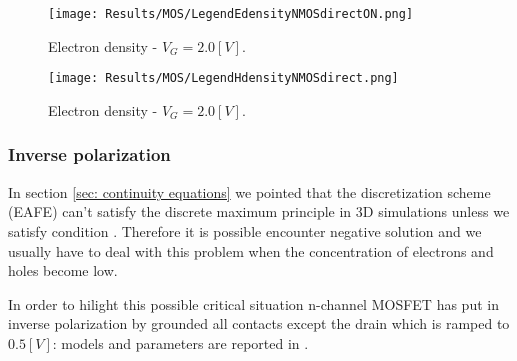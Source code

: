 \begin{figure}[!h]
\centering
{}
\hspace{0.06\textwidth}
\hspace{0.04\textwidth}
{\texttt{[image: Results/MOS/LegendEdensityNMOSdirectON.png]}}
\caption{Electron density - $V_G = 2.0 [V]$.}
\label{fig: ndensity mos}
\end{figure}

\vspace{0.5cm}

\begin{figure}[!h]
\centering
{}
\hspace{0.06\textwidth}
\hspace{0.04\textwidth}
{\texttt{[image: Results/MOS/LegendHdensityNMOSdirect.png]}}
\caption{Electron density - $V_G = 2.0 [V]$.}
\label{fig: pdensity mos}
\end{figure}




\subsubsection{Inverse polarization}
\label{sec: inv pol mos}

In section \ref{sec: continuity equations} we pointed that the discretization scheme (EAFE) can't satisfy the discrete maximum principle in 3D simulations unless we satisfy condition  .  Therefore it is possible encounter negative solution and we usually have to deal with this problem when the concentration of electrons and holes become low.

In order to hilight this possible critical situation n-channel MOSFET has put in inverse polarization by grounded all contacts except the drain which is ramped to $0.5[V]$: models and parameters are reported in .

